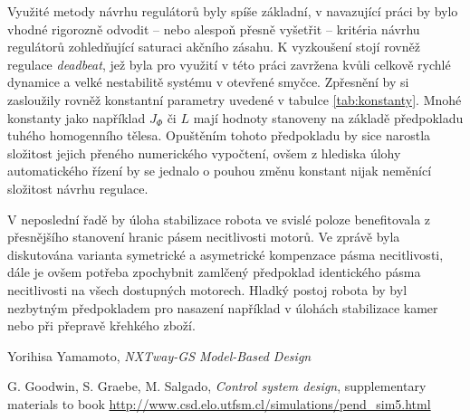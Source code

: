 \documentclass[conference]{IEEEtran}
\begin{document}
Využité metody návrhu regulátorů byly spíše základní, v navazující práci by bylo vhodné rigorozně odvodit -- nebo alespoň
přesně vyšetřit -- kritéria návrhu regulátorů zohledňující saturaci akčního zásahu.
K vyzkoušení stojí rovněž regulace \textit{deadbeat}, jež byla pro využití v této práci zavržena kvůli celkově rychlé dynamice a velké nestabilitě
systému v otevřené smyčce. Zpřesnění by si zasloužily rovněž konstantní parametry uvedené v tabulce \ref{tab:konstanty}.
Mnohé konstanty jako například $J_\varPhi$ či $L$ mají hodnoty stanoveny na základě předpokladu tuhého homogenního tělesa.
Opuštěním tohoto předpokladu by sice narostla složitost jejich přeného numerického vypočtení, ovšem z hlediska úlohy automatického řízení
by se jednalo o pouhou změnu konstant nijak neměnící složitost návrhu regulace.

V neposlední řadě by úloha stabilizace robota ve svislé poloze benefitovala z přesnějšího stanovení hranic pásem necitlivosti
motorů. Ve zprávě byla diskutována varianta symetrické a asymetrické kompenzace pásma necitlivosti, dále je ovšem potřeba zpochybnit
zamlčený předpoklad identického pásma necitlivosti na všech dostupných motorech. Hladký postoj robota by byl nezbytným předpokladem
pro nasazení například v úlohách stabilizace kamer nebo při přepravě křehkého zboží.



\begin{thebibliography}{9}
    
    Yorihisa Yamamoto, \emph{NXTway-GS Model-Based Design} 
    
     G. Goodwin, S. Graebe, M. Salgado, \emph{Control system design}, supplementary materials to book \url{http://www.csd.elo.utfsm.cl/simulations/pend_sim5.html}
    
\end{thebibliography}


\label{sec:simulink_nelin_model}
\end{document}
